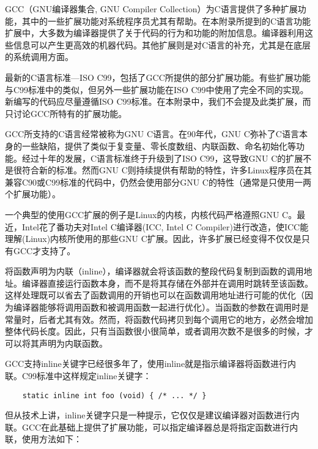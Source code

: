 
\appendix

GCC（GNU编译器集合, GNU Compiler Collection）为C语言提供了多种扩展功能，其中的一些扩展功能对系统程序员尤其有帮助。在本附录所提到的C语言功能扩展中，大多数为编译器提供了关于代码的行为和功能的附加信息。编译器利用这些信息可以产生更高效的机器代码。其他扩展则是对C语言的补充，尤其是在底层的系统调用方面。

最新的C语言标准---ISO C99，包括了GCC所提供的部分扩展功能。有些扩展功能与C99标准中的类似，但另外一些扩展功能在ISO C99中使用了完全不同的实现。新编写的代码应尽量遵循ISO C99标准。在本附录中，我们不会提及此类扩展，而只讨论GCC所特有的扩展功能。

GCC所支持的C语言经常被称为GNU C语言。在90年代，GNU C弥补了C语言本身的一些缺陷，提供了类似于复变量、零长度数组、内联函数、命名初始化等功能。经过十年的发展，C语言标准终于升级到了ISO C99，这导致GNU C的扩展不是很符合新的标准。然而GNU C则持续提供有帮助的特性，许多Linux程序员在其兼容C90或C99标准的代码中，仍然会使用部分GNU C的特性（通常是只使用一两个扩展功能）。

一个典型的使用GCC扩展的例子是Linux的内核，内核代码严格遵照GNU C。最近，Intel花了番功夫对Intel C编译器(ICC, Intel C Compiler)进行改造，使ICC能理解(Linux)内核所使用的那些GNU C扩展。因此，许多扩展已经变得不仅仅是只有GCC才支持了。

将函数声明为内联（inline），编译器就会将该函数的整段代码复制到函数的调用地址。编译器直接运行函数本身，而不是将其存储在外部并在调用时跳转至该函数。这样处理既可以省去了函数调用的开销也可以在函数调用地址进行可能的优化（因为编译器能够将调用函数和被调用函数一起进行优化）。当函数的参数在调用时是常量时，后者尤其有效。然而，将函数代码拷贝到每个调用它的地方，必然会增加整体代码长度。因此，只有当函数很小很简单，或者调用次数不是很多的时候，才可以将其声明为内联函数。

GCC支持inline关键字已经很多年了，使用inline就是指示编译器将函数进行内联。C99标准中这样规定inline关键字：
\begin{lstlisting}
	static inline int foo (void) { /* ... */ }
\end{lstlisting}
但从技术上讲，inline关键字只是一种提示，它仅仅是建议编译器对函数进行内联。GCC在此基础上提供了扩展功能，可以指定编译器总是将指定函数进行内联，使用方法如下：

